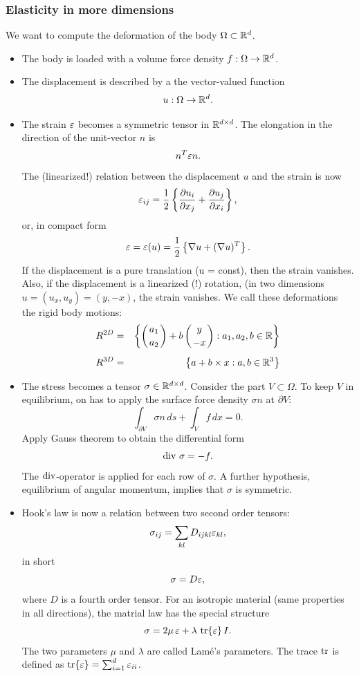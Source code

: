 \subsubsection{Elasticity in more dimensions}
We want to compute the deformation of the body $\Omega \subset {\mathbb R}^d$.
\begin{itemize}
\item
The body is loaded with a volume force density $f : \Omega \rightarrow {\mathbb R}^d$.
\item
The displacement is described by a the vector-valued function
$$
u : \Omega \rightarrow {\mathbb R}^d.
$$
\item
The strain $\varepsilon$ becomes a symmetric tensor in ${\mathbb R}^{d\times d}$. The elongation in
the direction of the unit-vector $n$ is
$$
n^T \varepsilon n.
$$
The (linearized!) relation between the displacement $u$ and the strain is now
$$
\varepsilon_{ij} = \frac{1}{2} \left\{ \frac{\partial u_i}{\partial x_j} + \frac{\partial u_j}{\partial x_i} \right\},
$$
or, in compact form
$$
\varepsilon = \varepsilon(u) = \frac{1}{2} \left\{ \nabla u + (\nabla u)^T \right\}.
$$
If the displacement is a pure translation (u = const), then the strain vanishes.
Also, if the displacement is a linearized (!) rotation, 
(in two dimensions $u = (u_x,u_y) = (y,-x)$, the strain vanishes. 
We call these deformations the rigid body motions:
\begin{eqnarray*}
R^{2D} & = & \left\{ \left( a_1 \atop a_2 \right) + b \left( y \atop -x \right) : a_1, a_2, b \in {\mathbb R} \right\} \\[0.5em]
R^{3D} & = & \left\{ a + b \times x : a, b \in {\mathbb R}^3 \right\}
\end{eqnarray*}
\item 
The stress becomes a tensor $\sigma \in {\mathbb R}^{d\times d}$. Consider the part $V \subset \Omega$. To keep $V$ in equilibrium, on has to apply the surface force density $\sigma n$ at $\partial V$:
$$
\int_{\partial V} \sigma n \, ds + \int_V f \, dx = 0.
$$
Apply Gauss theorem to obtain the differential form
$$
\operatorname{div} \, \sigma = -f.
$$
The $\operatorname{div}$-operator is applied for each row of $\sigma$. A further hypothesis, 
equilibrium of angular momentum, implies that $\sigma$ is symmetric.
\item
Hook's law is now a relation between two second order tensors:
$$
\sigma_{ij} = \sum_{kl} D_{ijkl} \varepsilon_{kl},
$$
in short
$$
\sigma = D \varepsilon,
$$
where $D$ is a fourth order tensor. For an isotropic material (same properties in all 
directions), the matrial law has the special structure
$$
\sigma = 2 \mu \, \varepsilon + \lambda \, \operatorname{tr} \{ \varepsilon \} \, I.
$$
The two parameters $\mu$ and $\lambda$ are called Lam\'e's parameters. The trace $\operatorname{tr}$
is defined as $\operatorname{tr} \{ \varepsilon \} = \sum_{i=1}^d \varepsilon_{ii}$.
\end{itemize}

